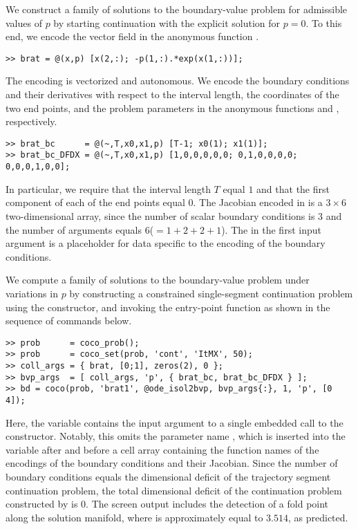 We construct a family of solutions to the boundary-value problem for admissible values of $p$ by starting continuation with the explicit solution for $p=0$. To this end, we encode the vector field in the anonymous function .
\begin{lstlisting}[language=coco-highlight]
>> brat = @(x,p) [x(2,:); -p(1,:).*exp(x(1,:))];
\end{lstlisting}
The encoding is vectorized and autonomous. We encode the boundary conditions and their derivatives with respect to the interval length, the coordinates of the two end points, and the problem parameters in the anonymous functions  and , respectively.
\begin{lstlisting}[language=coco-highlight]
>> brat_bc      = @(~,T,x0,x1,p) [T-1; x0(1); x1(1)];
>> brat_bc_DFDX = @(~,T,x0,x1,p) [1,0,0,0,0,0; 0,1,0,0,0,0; 0,0,0,1,0,0];
\end{lstlisting}
In particular, we require that the interval length $T$ equal $1$ and that the first component of each of the end points equal $0$. The Jacobian encoded in  is a $3\times 6$ two-dimensional array, since the number of scalar boundary conditions is $3$ and the number of arguments equals $6$($=1+2+2+1$). The \mcode{\~} in the first input argument is a placeholder for data specific to the encoding of the boundary conditions.

We compute a family of solutions to the boundary-value problem under variations in $p$ by constructing a constrained single-segment continuation problem using the  constructor, and invoking the  entry-point function as shown in the sequence of commands below.
\begin{lstlisting}[language=coco-highlight]
>> prob      = coco_prob();
>> prob      = coco_set(prob, 'cont', 'ItMX', 50);
>> coll_args = { brat, [0;1], zeros(2), 0 };
>> bvp_args  = [ coll_args, 'p', { brat_bc, brat_bc_DFDX } ];
>> bd = coco(prob, 'brat1', @ode_isol2bvp, bvp_args{:}, 1, 'p', [0 4]);
\end{lstlisting}
Here, the  variable contains the input argument to a single embedded call to the  constructor. Notably, this omits the parameter name , which is inserted into the  variable after  and before a cell array containing the function names of the encodings of the boundary conditions and their Jacobian. Since the number of boundary conditions equals the dimensional deficit of the trajectory segment continuation problem, the total dimensional deficit of the continuation problem constructed by  is $0$. The screen output includes the detection of a fold point along the solution manifold, where  is approximately equal to $3.514$, as predicted.


